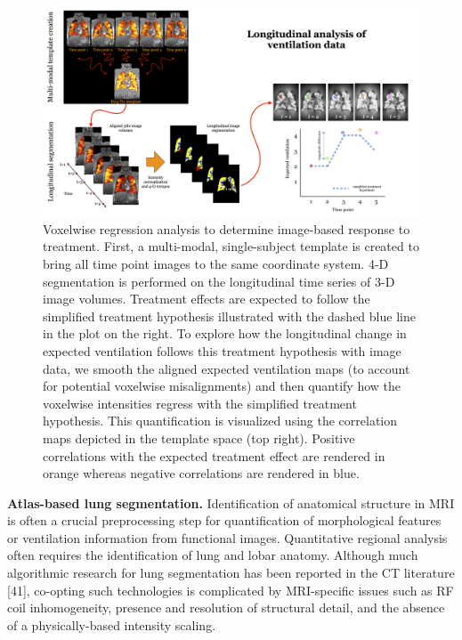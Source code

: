 \documentclass[11pt,]{article}
\begin{document}
\begin{figure}[htbp]
\centering
\includegraphics{Figs/longitudinalStudy.png}
\caption{Voxelwise regression analysis to determine image-based response
to treatment. First, a multi-modal, single-subject template is created
to bring all time point images to the same coordinate system. 4-D
segmentation is performed on the longitudinal time series of 3-D image
volumes. Treatment effects are expected to follow the simplified
treatment hypothesis illustrated with the dashed blue line in the plot
on the right. To explore how the longitudinal change in expected
ventilation follows this treatment hypothesis with image data, we smooth
the aligned expected ventilation maps (to account for potential
voxelwise misalignments) and then quantify how the voxelwise intensities
regress with the simplified treatment hypothesis. This quantification is
visualized using the correlation maps depicted in the template space
(top right). Positive correlations with the expected treatment effect
are rendered in orange whereas negative correlations are rendered in
blue.}
\end{figure}

\textbf{Atlas-based lung segmentation.} Identification of anatomical
structure in MRI is often a crucial preprocessing step for
quantification of morphological features or ventilation information from
functional images. Quantitative regional analysis often requires the
identification of lung and lobar anatomy. Although much algorithmic
research for lung segmentation has been reported in the CT literature
{[}41{]}, co-opting such technologies is complicated by MRI-specific
issues such as RF coil inhomogeneity, presence and resolution of
structural detail, and the absence of a physically-based intensity
scaling.
\end{document}
